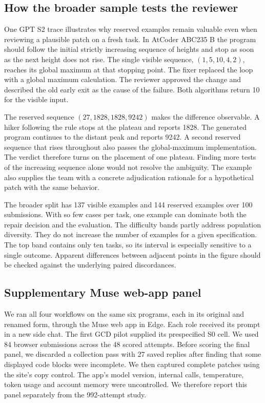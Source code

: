 \documentclass[conference]{IEEEtran}
\begin{document}
\subsection{How the broader sample tests the reviewer}
One GPT S2 trace illustrates why reserved examples remain valuable even when reviewing a plausible patch on a fresh task. In AtCoder ABC235 B the program should follow the initial strictly increasing sequence of heights and stop as soon as the next height does not rise. The single visible sequence, $(1,5,10,4,2)$, reaches its global maximum at that stopping point. The fixer replaced the loop with a global maximum calculation. The reviewer approved the change and described the old early exit as the cause of the failure. Both algorithms return 10 for the visible input.

The reserved sequence $(27,1828,1828,9242)$ makes the difference observable. A hiker following the rule stops at the plateau and reports 1828. The generated program continues to the distant peak and reports 9242. A second reserved sequence that rises throughout also passes the global-maximum implementation. The verdict therefore turns on the placement of one plateau. Finding more tests of the increasing sequence alone would not resolve the ambiguity. The example also supplies the team with a concrete adjudication rationale for a hypothetical patch with the same behavior.

The broader split has 137 visible examples and 144 reserved examples over 100 submissions. With so few cases per task, one example can dominate both the repair decision and the evaluation. The difficulty bands partly address population diversity. They do not increase the number of examples for a given specification. The top band contains only ten tasks, so its interval is especially sensitive to a single outcome. Apparent differences between adjacent points in the figure should be checked against the underlying paired discordances.

\subsection{Supplementary Muse web-app panel}
We ran all four workflows on the same six programs, each in its original and renamed form, through the Muse web app in Edge. Each role received its prompt in a new side chat. The first GCD pilot supplied its prespecified S0 cell. We used 84 browser submissions across the 48 scored attempts. Before scoring the final panel, we discarded a collection pass with 27 saved replies after finding that some displayed code blocks were incomplete. We then captured complete patches using the site's copy control. The app's model version, internal calls, temperature, token usage and account memory were uncontrolled. We therefore report this panel separately from the 992-attempt study.
\end{document}
